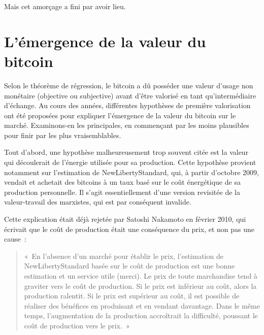 Mais cet amorçage a fini par avoir lieu.

\section*{L'émergence de la valeur du bitcoin}

Selon le théorème de régression, le bitcoin a dû posséder une valeur d'usage non monétaire (objective ou subjective) avant d'être valorisé en tant qu'intermédiaire d'échange. Au cours des années, différentes hypothèses de première valorisation ont été proposées pour expliquer l'émergence de la valeur du bitcoin sur le marché. Examinons-en les principales, en commençant par les moins plausibles pour finir par les plus vraisemblables.


Tout d'abord, une hypothèse malheureusement trop souvent citée est la valeur qui découlerait de l'énergie utilisée pour sa production. Cette hypothèse provient notamment sur l'estimation de NewLibertyStandard, qui, à partir d'octobre 2009, vendait et achetait des bitcoins à un taux basé sur le coût énergétique de sa production personnelle. Il s'agit essentiellement d'une version revisitée de la valeur-travail des marxistes, qui est par conséquent invalide.

Cette explication était déjà rejetée par Satoshi Nakamoto en février 2010, qui écrivait que le coût de production était une conséquence du prix, et non pas une cause~:

\begin{quote}
«~En l'absence d'un marché pour établir le prix, l'estimation de NewLibertyStandard basée sur le coût de production est une bonne estimation et un service utile (merci). Le prix de toute marchandise tend à graviter vers le coût de production. Si le prix est inférieur au coût, alors la production ralentit. Si le prix est supérieur au coût, il est possible de réaliser des bénéfices en produisant et en vendant davantage. Dans le même temps, l'augmentation de la production accroîtrait la difficulté, poussant le coût de production vers le prix.~»
\end{quote}

